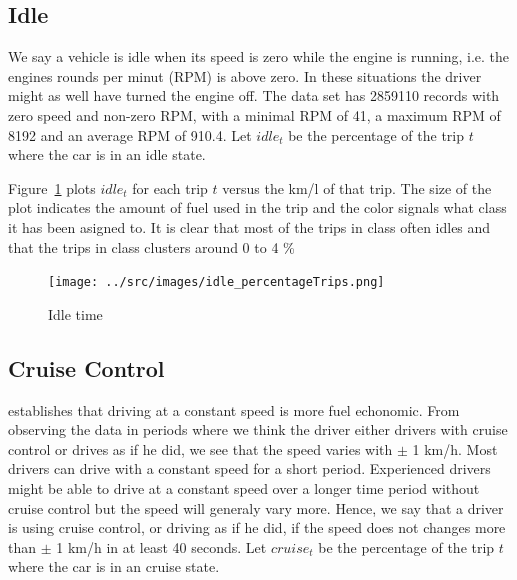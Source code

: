 \subsection{Idle}
We say a vehicle is idle when its speed is zero while the engine is running, i.e. the engines rounds per minut (RPM) is above zero. 
In these situations the driver might as well have turned the engine off.
The data set has 2859110 records with zero speed and non-zero RPM, with a minimal RPM of 41, a maximum RPM of 8192 and an average RPM of 910.4. %
Let $idle_t$ be the percentage of the trip $t$ where the car is in an idle state.

Figure~\ref{fig:idleTrips} plots $idle_t$ for each trip $t$ versus the km/l of that trip.
The size of the plot indicates the amount of fuel used in the trip and the color signals what class it has been asigned to. 
It is clear that most of the trips in class \fuelLow often idles and that the trips in class \fuelHigh clusters around 0 to 4 \%

\begin{figure}[htb]
\centering
\texttt{[image: ../src/images/idle\_percentageTrips.png]}
\caption{Idle time}
\label{fig:idleTrips}
\end{figure}

\subsection{Cruise Control}

\cite{} establishes that driving at a constant speed is more fuel echonomic. 
From observing the data in periods where we think the driver either drivers with cruise control or drives as if he did, we see that the speed varies with $\pm$ 1 km/h.
Most drivers can drive with a constant speed for a short period. 
Experienced drivers might be able to drive at a constant speed over a longer time period without cruise control but the speed will generaly vary more. 
Hence, we say that a driver is using cruise control, or driving as if he did, if the speed does not changes more than $\pm$ 1 km/h in at least 40 seconds. %
Let $cruise_t$ be the percentage of the trip $t$ where the car is in an cruise state.

